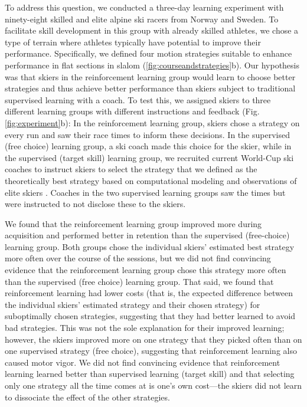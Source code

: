 \documentclass[pdflatex,sn-mathphys-num]{sn-jnl}%
\theoremstyle{thmstyleone}%
\theoremstyle{thmstyletwo}%
\theoremstyle{thmstylethree}%
\begin{document}
To address this question, we conducted a three-day learning experiment with ninety-eight skilled and elite alpine ski racers from Norway and Sweden. To facilitate skill development in this group with already skilled athletes, we chose a type of terrain where athletes typically have potential to improve their performance. Specifically, we defined four motion strategies suitable to enhance performance in flat sections in slalom  (\ref{fig:courseandstrategies}b). Our hypothesis was that skiers in the reinforcement learning group would learn to choose better strategies and thus achieve better performance than skiers subject to traditional supervised learning with a coach. To test this, we assigned skiers to three different learning groups with different instructions and feedback (Fig. \ref{fig:experiment}b): In the reinforcement learning group, skiers chose a strategy on every run and saw their race times to inform these decisions. In the supervised (free choice) learning group, a ski coach made this choice for the skier, while in the supervised (target skill) learning group, we recruited current World-Cup ski coaches to instruct skiers to select the strategy that we defined as the theoretically best strategy based on computational modeling \cite{lind_physics_2013} and observations of elite skiers \cite{reid_alpine_2020}. Coaches in the two supervised learning groups saw the times but were instructed to not disclose these to the skiers. 

We found that the reinforcement learning group improved more during acquisition and performed better in retention than the supervised (free-choice) learning group. Both groups chose the individual skiers' estimated best strategy more often over the course of the sessions, but we did not find convincing evidence that the reinforcement learning group chose this strategy more often than the supervised (free choice) learning group. That said, we found that reinforcement learning had lower costs (that is, the expected difference between the individual skiers' estimated strategy and their chosen strategy) for suboptimally chosen strategies, suggesting that they had better learned to avoid bad strategies. This was not the sole explanation for their improved learning; however, the skiers improved more on one strategy that they picked often than on one supervised strategy (free choice), suggesting that reinforcement learning also caused motor vigor. We did not find convincing evidence that reinforcement learning learned better than supervised learning (target skill) and that selecting only one strategy all the time comes at is one’s own cost—the skiers did not learn to dissociate the effect of the other strategies.
\end{document}
